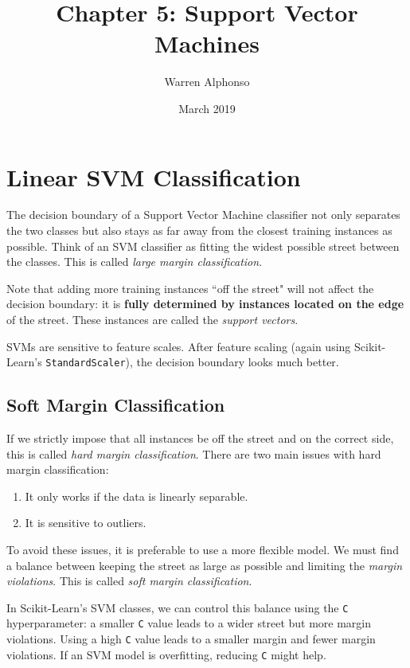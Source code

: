 \documentclass[letterpaper]{article}
\title{Chapter 5: Support Vector Machines}
\author{Warren Alphonso}
\date{March 2019}
\begin{document}
\maketitle

\section{Linear SVM Classification}
The decision boundary of a Support Vector Machine classifier not only separates the two classes but also stays as far away from the closest training instances as possible. Think of an SVM classifier as fitting the widest possible street between the classes. This is called \textsl{large margin classification}. 

Note that adding more training instances ``off the street" will not affect the decision boundary: it is \textbf{fully determined by instances located on the edge} of the street. These instances are called the \textsl{support vectors}. 

SVMs are sensitive to feature scales. After feature scaling (again using Scikit-Learn's \texttt{StandardScaler}), the decision boundary looks much better. 

\subsection{Soft Margin Classification}
If we strictly impose that all instances be off the street and on the correct side, this is called \textsl{hard margin classification}. There are two main issues with hard margin classification: 

\begin{enumerate}
	\item It only works if the data is linearly separable. 
	\item It is sensitive to outliers. 
\end{enumerate}

To avoid these issues, it is preferable to use a more flexible model. We must find a balance between keeping the street as large as possible and limiting the \textsl{margin violations}. This is called \textsl{soft margin classification}. 

In Scikit-Learn's SVM classes, we can control this balance using the \texttt{C} hyperparameter: a smaller \texttt{C} value leads to a wider street but more margin violations. Using a high \texttt{C} value leads to a smaller margin and fewer margin violations. If an SVM model is overfitting, reducing \texttt{C} might help. 
\end{document}
